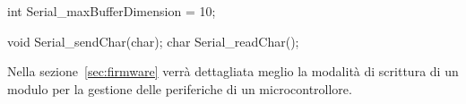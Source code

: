 \begin{minipage}[t]{\rbwidth}
\begin{RightCode}

int Serial_maxBufferDimension = 10;

void Serial_sendChar(char);
char Serial_readChar();
\end{RightCode}
\end{minipage}

Nella sezione~\ref{sec:firmware} verrà dettagliata meglio la modalità di scrittura di un modulo per la gestione delle periferiche di un microcontrollore.